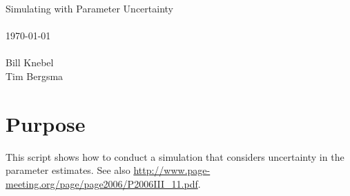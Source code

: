 
\usepackage{Sweave}

 

\vspace*{2cm}
\begin{center}
{\Large Simulating with Parameter Uncertainty}\\
~\\
\today\\
~\\
Bill Knebel\\
Tim Bergsma\\
\end{center}
\newpage

\section{Purpose}
This script shows how to conduct a simulation that
considers uncertainty in the parameter estimates.  See also \url{http://www.page-meeting.org/page/page2006/P2006III_11.pdf}.
